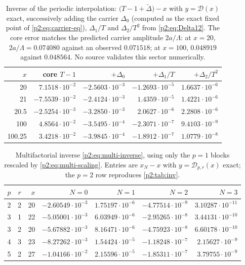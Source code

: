 \documentclass[11pt,a4paper,oneside]{book}
\theoremstyle{plain}
\theoremstyle{definition}
\theoremstyle{remark}
\begin{document}
\begin{table}[htbp]
\centering\small
\caption{Inverse of the periodic interpolation:
\(\bigl(T-1+\widetilde\Delta\bigr)-x\) with \(y=\mathscr D(x)\) exact,
successively adding the carrier \(\Delta_0\) (computed as the exact fixed point
of \cref{p2:eq:carrier-eq}), \(\Delta_1/T\) and \(\Delta_2/T^2\) from
\cref{p2:eq:Delta12}.  The core error matches the predicted carrier amplitude
\(2a/\Lambda\): at \(x=20\), \(2a/\Lambda=0.074080\) against an observed
\(0.071518\); at \(x=100\), \(0.048919\) against \(0.048564\).  No source
validates this sector numerically.}
\label{p2:tab:oeis-inv}
\begin{tabular}{r r r r r}
\toprule
\(x\)&core \(T-1\)&\(+\Delta_0\)&\(+\Delta_1/T\)&\(+\Delta_2/T^2\)\\
\midrule
20     & \(7.1518\cdot10^{-2}\) & \(-2.5603\cdot10^{-3}\)
       & \(-1.2693\cdot10^{-5}\) & \(1.6637\cdot10^{-6}\)\\
21     & \(-7.5539\cdot10^{-2}\) & \(-2.4124\cdot10^{-3}\)
       & \(1.4359\cdot10^{-5}\) & \(1.4221\cdot10^{-6}\)\\
20.5   & \(-2.5254\cdot10^{-3}\) & \(-3.2850\cdot10^{-3}\)
       & \(2.0627\cdot10^{-6}\) & \(2.2808\cdot10^{-6}\)\\
100    & \(4.8564\cdot10^{-2}\) & \(-3.5495\cdot10^{-4}\)
       & \(-2.3071\cdot10^{-7}\) & \(9.4103\cdot10^{-9}\)\\
100.25 & \(3.4218\cdot10^{-2}\) & \(-3.9845\cdot10^{-4}\)
       & \(-1.8912\cdot10^{-7}\) & \(1.0779\cdot10^{-8}\)\\
\bottomrule
\end{tabular}
\end{table}

\begin{table}[htbp]
\centering\small
\caption{Multifactorial inverse \cref{p2:eq:multi-inverse}, using only the
\(p=1\) blocks rescaled by \cref{p2:eq:multi-scaling}.  Entries are
\(x_N-x\) with \(y=\mathcal D_{p,r}(x)\) exact; the \(p=2\) row reproduces
\cref{p2:tab:inv}.}
\label{p2:tab:multi-inv}
\begin{tabular}{c c r r r r r}
\toprule
\(p\)&\(r\)&\(x\)&\(N=0\)&\(N=1\)&\(N=2\)&\(N=3\)\\
\midrule
2&2& 20 & \(-2.60549\cdot10^{-3}\) & \(1.75197\cdot10^{-6}\)
       & \(-4.77514\cdot10^{-9}\) & \(3.10287\cdot10^{-11}\)\\
3&1& 22 & \(-5.05001\cdot10^{-3}\) & \(6.03949\cdot10^{-6}\)
       & \(-2.95265\cdot10^{-8}\) & \(3.44131\cdot10^{-10}\)\\
3&2& 20 & \(-5.67882\cdot10^{-3}\) & \(8.16471\cdot10^{-6}\)
       & \(-4.75923\cdot10^{-8}\) & \(6.60178\cdot10^{-10}\)\\
4&3& 23 & \(-8.27262\cdot10^{-3}\) & \(1.54424\cdot10^{-5}\)
       & \(-1.18248\cdot10^{-7}\) & \(2.15627\cdot10^{-9}\)\\
5&2& 27 & \(-1.04166\cdot10^{-2}\) & \(2.15596\cdot10^{-5}\)
       & \(-1.85311\cdot10^{-7}\) & \(3.79755\cdot10^{-9}\)\\
\bottomrule
\end{tabular}
\end{table}
\end{document}

